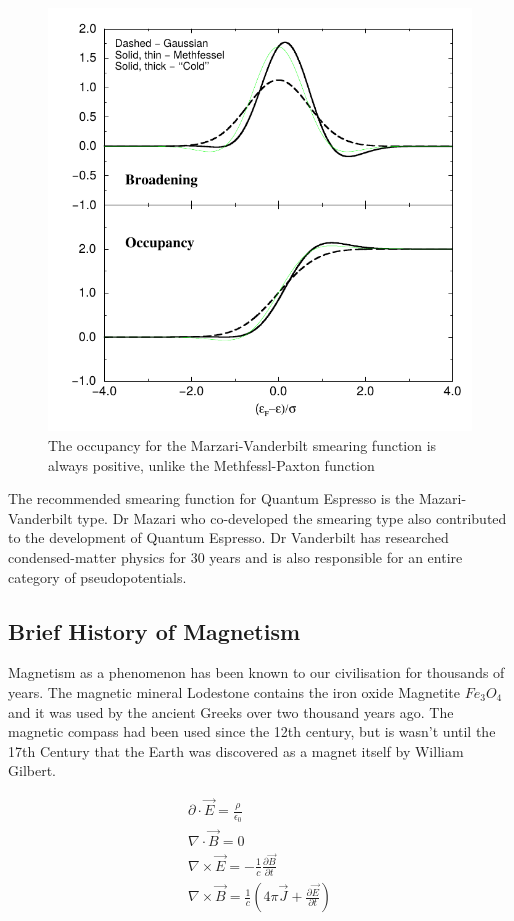 \begin{figure}
\centering
\begin{minipage}{.65\textwidth}
\centering
    \includegraphics[width=.6\linewidth]{chapters/interatomic_potential_fitting/images/marzarismearing.png}
    \caption{The occupancy for the Marzari-Vanderbilt smearing function is always positive, unlike the Methfessl-Paxton function\cite{marzarithesis2}}
    \label{fig:marzarimethfessel}
\end{minipage}
\end{figure}

The recommended smearing function for Quantum Espresso is the Mazari-Vanderbilt type.  Dr Mazari
who co-developed the smearing type also contributed to the development of Quantum Espresso.  Dr Vanderbilt has researched condensed-matter physics for 30 years and is also responsible for an entire category of pseudopotentials.



\FloatBarrier
\subsection{Brief History of Magnetism}

Magnetism as a phenomenon has been known to our civilisation for thousands of years.  The magnetic mineral Lodestone contains the iron oxide Magnetite $Fe_3 O_4$ and it was used by the ancient Greeks over two thousand years ago.  The magnetic compass had been used since the 12th century, but is wasn't until the 17th Century that the Earth was discovered as a magnet itself by William Gilbert.

\begin{equation}
\begin{split}
\partial \cdot \vec{E} = \frac{\rho}{\epsilon_0} \\
\nabla \cdot \vec{B} = 0 \\
\nabla \times \vec{E} = -\frac{1}{c} \frac{\partial\vec{B}}{\partial t} \\
\nabla \times \vec{B} = \frac{1}{c}\left(4 \pi \vec{J} + \frac{\partial \vec{E}}{\partial t}\right) \\
\end{split}
\label{eq:maxwell}
\end{equation}


